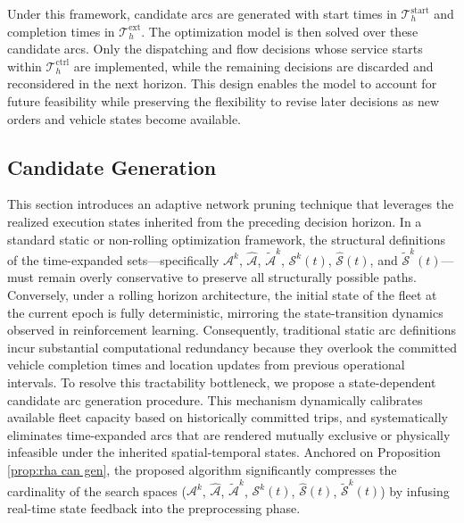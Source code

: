 \documentclass[10pt, reqno]{amsart}
\begin{document}
Under this framework, candidate arcs are generated with start times in $\mathcal T_h^{\mathrm{start}}$ and completion times in $\mathcal T_h^{\mathrm{ext}}$. The optimization model is then solved over these candidate arcs. Only the dispatching and flow decisions whose service starts within $\mathcal T_h^{\mathrm{ctrl}}$ are implemented, while the remaining decisions are discarded and reconsidered in the next horizon. This design enables the model to account for future feasibility while preserving the flexibility to revise later decisions as new orders and vehicle states become available.
\subsection{Candidate Generation}\label{sub:candidate generation}
This section introduces an adaptive network pruning technique that leverages the realized execution states inherited from the preceding decision horizon. In a standard static or non-rolling optimization framework, the structural definitions of the time-expanded sets---specifically $\mathcal{A}^k$, $\hat{\mathcal{A}}$, $\tilde{\mathcal{A}}^k$, $\mathcal{S}^k(t)$, $\hat{\mathcal{S}}(t)$, and $\tilde{\mathcal{S}}^k(t)$---must remain overly conservative to preserve all structurally possible paths. Conversely, under a rolling horizon architecture, the initial state of the fleet at the current epoch is fully deterministic, mirroring the state-transition dynamics observed in reinforcement learning. Consequently, traditional static arc definitions incur substantial computational redundancy because they overlook the committed vehicle completion times and location updates from previous operational intervals. To resolve this tractability bottleneck, we propose a state-dependent candidate arc generation procedure. This mechanism dynamically calibrates available fleet capacity based on historically committed trips, and systematically eliminates time-expanded arcs that are rendered mutually exclusive or physically infeasible under the inherited spatial-temporal states. Anchored on Proposition \ref{prop:rha can gen}, the proposed algorithm significantly compresses the cardinality of the search spaces ($\mathcal{A}^k$, $\hat{\mathcal{A}}$, $\tilde{\mathcal{A}}^k$, $\mathcal{S}^k(t)$, $\hat{\mathcal{S}}(t)$, $\tilde{\mathcal{S}}^k(t)$) by infusing real-time state feedback into the preprocessing phase.
\end{document}
